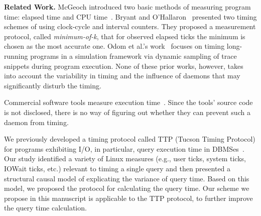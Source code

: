\documentclass[letter]{ieice}
\begin{document}
{\bf Related Work.} 
McGeoch introduced
two basic methods of measuring program time: elapsed time and CPU time~\cite{Mcgeoch12}. 
Bryant and O'Hallaron~\cite{Randal03} 
presented two timing schemes of using clock-cycle and interval counters. 
They proposed a measurement protocol, called {\em minimum-of-k}, 
that for observed elapsed ticks the minimum is chosen as the most accurate one. 
Odom et al.'s work~\cite{Odom05} focuses on timing long-running programs 
in a simulation framework via 
dynamic sampling of trace snippets during program execution. 
None of these prior works, however, takes into account the variability in 
timing and the influence of daemons that may significantly disturb the timing.


Commercial software tools measure execution time~\cite{VTune,TimeSys,WindView}. 
Since the tools' source code is not disclosed, there is no way of figuring out 
whether they can prevent such a daemon from timing. 

We previously developed a timing protocol called TTP (Tucson Timing Protocol)
for programs exhibiting I/O, in particular, query execution time in \hbox{DBMSes}~\cite{Currim}.
Our study identified a variety of Linux measures 
(e.g., user ticks, system ticks, IOWait ticks, etc.) 
relevant to timing a single query and then 
presented a structural causal model 
of explicating the variance of query time. 
Based on this model, we proposed the protocol for calculating the query time. 
Our scheme we propose in this manuscript 
is applicable to the TTP protocol, to further improve the query time calculation.
\end{document}
